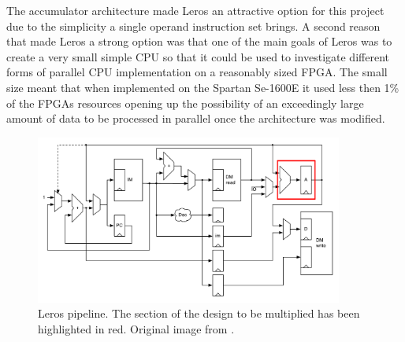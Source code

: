 The accumulator architecture made Leros an attractive option for this project
due to 
the simplicity a single operand instruction set brings. A second reason that
made Leros a strong option was that one of the main goals of Leros was to create
a very small simple CPU so that it could be used to investigate different forms
of parallel CPU implementation on a reasonably sized FPGA. The small size meant
that when implemented on the Spartan Se-1600E it used less then 1\% of the FPGAs
resources opening up the possibility of an exceedingly large amount of data to
be processed in parallel once the architecture was modified.
 
\begin{figure}[h]
\center
\includegraphics[width=0.9\textwidth]{images/leros-system}
\caption{Leros pipeline. The section of the design to be multiplied has been
highlighted in red. Original image from \cite{schoeberlleros}.
}
\label{fig:leros-system}
\end{figure}